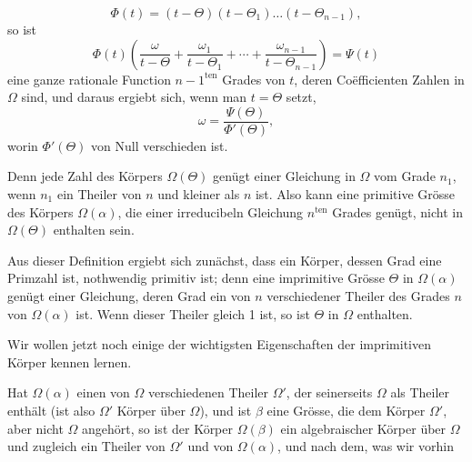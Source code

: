 \[
\Phi(t) = (t - \Theta)(t - \Theta_1) \ldots (t - \Theta_{n-1}),
\]
so ist
\[
\Phi(t) \left( \frac{\omega}{t - \Theta} + \frac{\omega_1}{t - \Theta_1} + \cdots + \frac{\omega_{n-1}}{t - \Theta_{n-1}} \right) = \Psi(t)
\]
eine ganze rationale Function $n - 1^{\mathrm{ten}}$ Grades von $t$,
deren Co\"efficienten Zahlen in $\Omega$ sind, und daraus ergiebt
sich, wenn man $t = \Theta$ setzt,
\[
\omega = \frac{\Psi(\Theta)}{\Phi'(\Theta)},
\]
worin $\Phi'(\Theta)$ von Null verschieden ist.



Denn jede Zahl des Körpers $\Omega(\Theta)$ genügt einer Gleichung
in $\Omega$ vom Grade $n_1$, wenn $n_1$ ein Theiler von $n$ und
kleiner als $n$ ist. Also kann eine primitive Grösse des Körpers
$\Omega(\alpha)$, die einer irreducibeln Gleichung $n^{\mathrm{ten}}$
Grades genügt, nicht in $\Omega(\Theta)$ enthalten sein.


Aus dieser Definition ergiebt sich zunächst, dass ein Körper,
dessen Grad eine Primzahl ist, nothwendig primitiv ist; denn eine
imprimitive Grösse $\Theta$ in $\Omega(\alpha)$ genügt einer
Gleichung, deren Grad ein von $n$ verschiedener Theiler des Grades
$n$ von $\Omega(\alpha)$ ist. Wenn dieser Theiler gleich 1 ist, so
ist $\Theta$ in $\Omega$ enthalten.

Wir wollen jetzt noch einige der wichtigsten Eigenschaften der
imprimitiven Körper kennen lernen.

Hat $\Omega(\alpha)$ einen von $\Omega$ verschiedenen Theiler
$\Omega'$, der seinerseits $\Omega$ als Theiler enthält (ist also
$\Omega'$ Körper über $\Omega$), und ist $\beta$ eine Grösse, die
dem Körper $\Omega'$, aber nicht $\Omega$ angehört, so ist der
Körper $\Omega(\beta)$ ein algebraischer Körper über $\Omega$ und
zugleich ein Theiler von $\Omega'$ und von $\Omega(\alpha)$, und
nach dem, was wir vorhin
